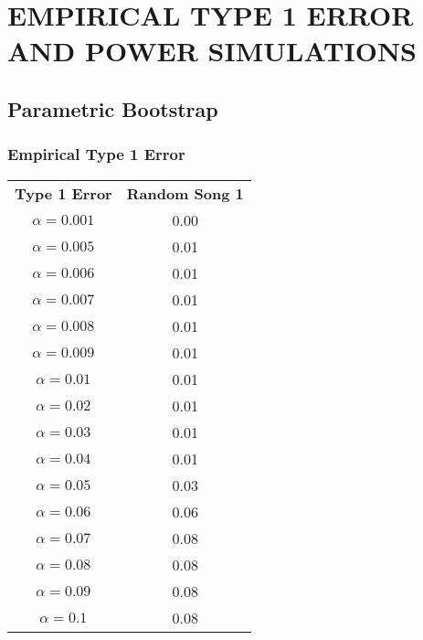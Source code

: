 \documentclass[12pt, letterpaper]{article}
\begin{document}
\section{EMPIRICAL TYPE 1 ERROR AND POWER SIMULATIONS}

\subsection{Parametric Bootstrap}
\subsubsection{Empirical Type 1 Error} 

\begin{tabular}{|c|c|}
\textbf{Type 1 Error} & \textbf{Random Song 1}\\
$\alpha = 0.001$ & 0.00\\
$\alpha = 0.005$ &  0.01\\
$\alpha = 0.006$ &  0.01\\
$\alpha = 0.007$ & 0.01\\
$\alpha = 0.008$ & 0.01\\
$\alpha = 0.009$ & 0.01\\
$\alpha = 0.01$ & 0.01\\
$\alpha = 0.02$ & 0.01\\
$\alpha = 0.03$ & 0.01\\
$\alpha = 0.04$ & 0.01\\
$\alpha = 0.05$ &  0.03\\
$\alpha = 0.06$ &  0.06\\
$\alpha = 0.07$ &  0.08\\
$\alpha = 0.08$ &  0.08\\
$\alpha = 0.09$ & 0.08\\
$\alpha = 0.1$ & 0.08 \\
\end{tabular}
\end{document}

